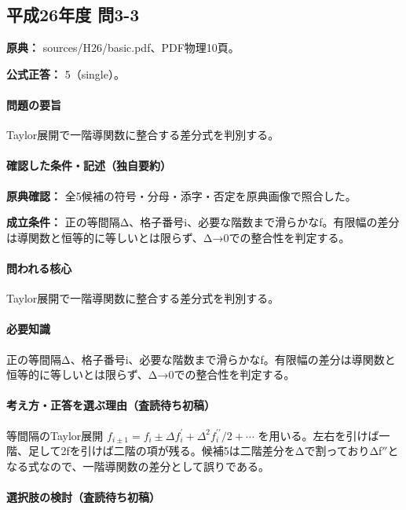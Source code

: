 \subsection{平成26年度 問3-3}
\label{q:h26-reg-basic-3-3}

\noindent\textbf{原典：} sources/H26/basic.pdf、PDF物理10頁。

\textbf{公式正答：} 5（single）。

\paragraph{問題の要旨} Taylor展開で一階導関数に整合する差分式を判別する。

\paragraph{確認した条件・記述（独自要約）}\mbox{}\par

\noindent\textbf{原典確認：} 全5候補の符号・分母・添字・否定を原典画像で照合した。\par

\noindent\textbf{成立条件：} 正の等間隔Δ、格子番号i、必要な階数まで滑らかなf。有限幅の差分は導関数と恒等的に等しいとは限らず、Δ→0での整合性を判定する。\par

\paragraph{問われる核心} Taylor展開で一階導関数に整合する差分式を判別する。

\paragraph{必要知識} 正の等間隔Δ、格子番号i、必要な階数まで滑らかなf。有限幅の差分は導関数と恒等的に等しいとは限らず、Δ→0での整合性を判定する。

\paragraph{考え方・正答を選ぶ理由（査読待ち初稿）} 等間隔のTaylor展開 \(f_{i\pm1}=f_i\pm\Delta f_i^\prime+\Delta^2f_i^{\prime\prime}/2+\cdots\) を用いる。左右を引けば一階、足して2fを引けば二階の項が残る。候補5は二階差分をΔで割っておりΔf\ensuremath{''}となる式なので、一階導関数の差分として誤りである。

\paragraph{選択肢の検討（査読待ち初稿）}\mbox{}\par

